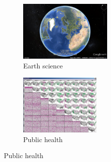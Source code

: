 {	\newcommand{\applicationwidth}{0.32\textwidth}
	\newcommand{\applicationheight}{3cm}
	\begin{figure}[H]
		\centering
        \begin{subfigure}[b]{\applicationwidth}
            \includegraphics[width=\textwidth,height=\applicationheight]{images/literature/earth-science}
            \caption{Earth science \parencite{google2015earth}}
            \label{fig:earth_science}
        \end{subfigure}
        \begin{subfigure}[b]{\applicationwidth}
            \includegraphics[width=\textwidth,height=\applicationheight]{images/literature/public-health}
            	\caption{\tiny{Public health \parencite{maceachren2004geovisualization}}}
            \label{fig:public_health}

\end{subfigure}
\end{figure}}
